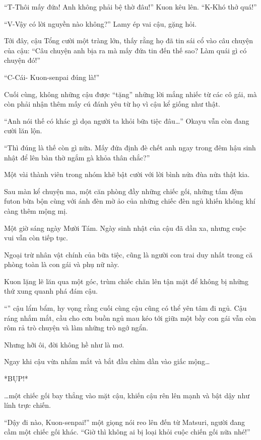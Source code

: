 \documentclass[../main.tex]{subfiles}
\begin{document}
``T-Thôi mấy đứa! Anh không phải bệ thờ đâu!'' Kuon kêu lên. ``K-Khó thở quá!''

``V-Vậy có lời nguyền nào không?'' Lamy ép vai cậu, gặng hỏi.

Tới đây, cậu Tổng cười một tràng lớn, thấy rằng họ đã tin sái cổ vào câu chuyện của cậu: ``Câu chuyện anh bịa ra mà mấy đứa tin đến thế sao? Làm quái gì có chuyện đó!''

``C-Cái- Kuon-senpai đúng là!''

Cuối cùng, không những cậu được ``tặng'' những lời mắng nhiếc từ các cô gái, mà còn phải nhận thêm mấy cú đánh yêu từ họ vì cậu kể giống như thật.

``Anh nói thế có khác gì dọa người ta khỏi bữa tiệc đâu\dots'' Okayu vẫn còn đang cười lăn lộn.

``Thì đúng là thế còn gì nữa. Mấy đứa định đè chết anh ngay trong đêm hậu sinh nhật để lên bàn thờ ngắm gà khỏa thân chắc?''

Một vài thành viên trong nhóm khẽ bật cười với lời bình nửa đùa nửa thật kia.

\ct

Sau màn kể chuyện ma, một căn phòng đầy những chiếc gối, những tấm đệm futon bừa bộn cùng với ánh đèn mờ ảo của những chiếc đèn ngủ khiến không khí càng thêm mộng mị.

Một giờ sáng ngày Mười Tám. Ngày sinh nhật của cậu đã dần xa, nhưng cuộc vui vẫn còn tiếp tục.

Ngoại trừ nhân vật chính của bữa tiệc, cũng là người con trai duy nhất trong că phòng toàn là con gái và phụ nữ này.

Kuon lặng lẽ lăn qua một góc, trùm chiếc chăn lên tận mặt để không bị những thứ xung quanh phá đám cậu.

``'' cậu lẩm bẩm, hy vọng rằng cuối cùng cậu cũng có thể yên tâm đi ngủ. Cậu ráng nhắm mắt, cầu cho cơn buồn ngủ mau kéo tới giữa một bầy con gái vẫn còn rôm rả trò chuyện và làm những trò ngớ ngẩn.

Nhưng hỡi ôi, đời không hề như là mơ.

Ngay khi cậu vừa nhắm mắt và bắt đầu chìm dần vào giấc mộng\dots

*BỤP!*

\dots một chiếc gối bay thẳng vào mặt cậu, khiến cậu rên lên mạnh và bật dậy như lính trực chiến.

``Dậy đi nào, Kuon-senpai!'' một giọng nói reo lên đến từ Matsuri, người đang cầm một chiếc gối khác. ``Giờ thì không ai bị loại khỏi cuộc chiến gối nữa nhé!''
\end{document}
